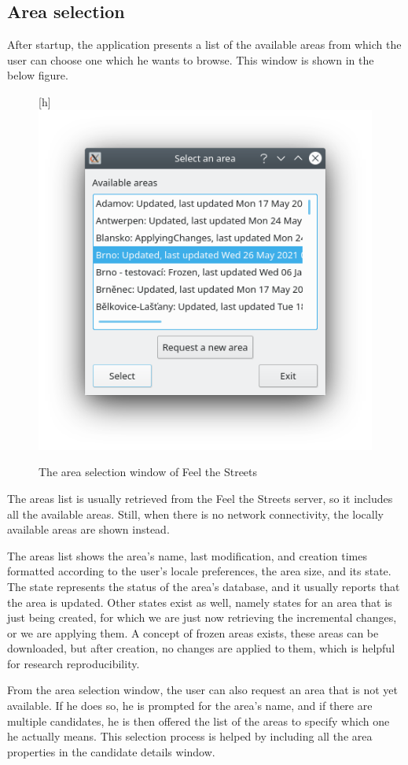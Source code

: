 \documentclass[nolof,digital]{fithesis3}
\begin{document}
\subsection{Area selection}
After startup, the application presents a list of the available areas from which the user can choose one which he wants to browse. This window is shown in the below figure.
\begin{figure}[h]
\caption{The area selection window of Feel the Streets}[h]
\includegraphics{fts-areas}
\end{figure}
The areas list is usually retrieved from the Feel the Streets server, so it includes all the available areas. Still, when there is no network connectivity, the locally available areas are shown instead.

The areas list shows the area's name, last modification, and creation times formatted according to the user's locale preferences, the area size, and its state. The state represents the status of the area's database, and it usually reports that the area is updated. Other states exist as well, namely states for an area that is just being created, for which we are just now retrieving the incremental changes, or we are applying them. A  concept of frozen areas exists, these areas can be downloaded, but after creation, no changes are applied to them, which is helpful for research reproducibility.

From the area selection window, the user can also request an area that is not yet available. If he does so, he is prompted for the area's name, and if there are multiple candidates, he is then offered the list of the areas to specify which one he actually means. This selection process is helped by including all the area properties in the candidate details window.
\end{document}
